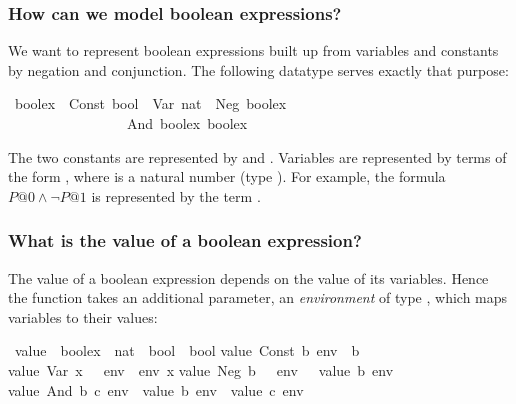 \begin{isabelle}%
%
\begin{isamarkuptext}%
\subsubsection{How can we model boolean expressions?}

We want to represent boolean expressions built up from variables and
constants by negation and conjunction. The following datatype serves exactly
that purpose:%
\end{isamarkuptext}%
\ boolex\ {\isacharequal}\ Const\ bool\ {\isacharbar}\ Var\ nat\ {\isacharbar}\ Neg\ boolex\isanewline
\ \ \ \ \ \ \ \ \ \ \ \ \ \ \ \ {\isacharbar}\ And\ boolex\ boolex%
\begin{isamarkuptext}%
\noindent
The two constants are represented by  and
. Variables are represented by terms of the form
, where  is a natural number (type ).
For example, the formula $P@0 \land \neg P@1$ is represented by the term
.

\subsubsection{What is the value of a boolean expression?}

The value of a boolean expression depends on the value of its variables.
Hence the function  takes an additional parameter, an {\em
  environment} of type , which maps variables to
their values:%
\end{isamarkuptext}%
\ value\ {\isacharcolon}{\isacharcolon}\ {\isachardoublequote}boolex\ {\isasymRightarrow}\ {\isacharparenleft}nat\ {\isasymRightarrow}\ bool{\isacharparenright}\ {\isasymRightarrow}\ bool{\isachardoublequote}\isanewline
{}\isanewline
{\isachardoublequote}value\ {\isacharparenleft}Const\ b{\isacharparenright}\ env\ {\isacharequal}\ b{\isachardoublequote}\isanewline
{\isachardoublequote}value\ {\isacharparenleft}Var\ x{\isacharparenright}\ \ \ env\ {\isacharequal}\ env\ x{\isachardoublequote}\isanewline
{\isachardoublequote}value\ {\isacharparenleft}Neg\ b{\isacharparenright}\ \ \ env\ {\isacharequal}\ {\isacharparenleft}{\isasymnot}\ value\ b\ env{\isacharparenright}{\isachardoublequote}\isanewline
{\isachardoublequote}value\ {\isacharparenleft}And\ b\ c{\isacharparenright}\ env\ {\isacharequal}\ {\isacharparenleft}value\ b\ env\ {\isasymand}\ value\ c\ env{\isacharparenright}{\isachardoublequote}%
\begin{isamarkuptext}%
\noindent

\end{isamarkuptext}
\end{isabelle}
